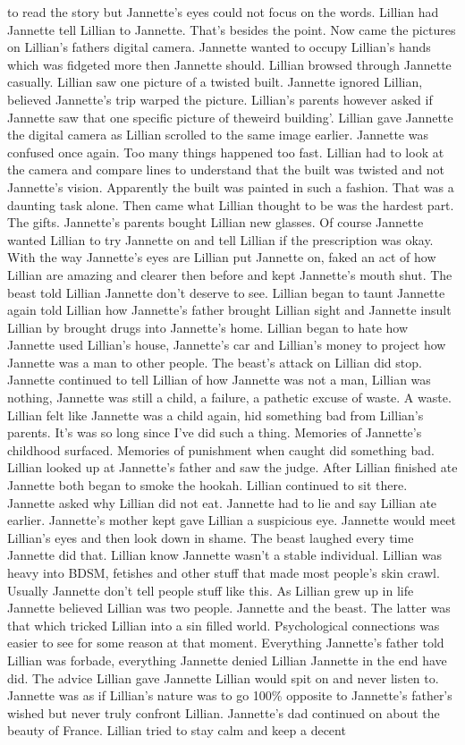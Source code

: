 \documentclass[12pt]{book}
\begin{document}
to read the story but Jannette's eyes could not focus on the words. Lillian had Jannette tell Lillian to Jannette. That's besides the point. Now came the pictures on Lillian's fathers digital camera. Jannette wanted to occupy Lillian's hands which was fidgeted more then Jannette should. Lillian browsed through Jannette casually. Lillian saw one picture of a twisted built. Jannette ignored Lillian, believed Jannette's trip warped the picture. Lillian's parents however asked if Jannette saw that one specific picture of theweird building'. Lillian gave Jannette the digital camera as Lillian scrolled to the same image earlier. Jannette was confused once again. Too many things happened too fast. Lillian had to look at the camera and compare lines to understand that the built was twisted and not Jannette's vision. Apparently the built was painted in such a fashion. That was a daunting task alone. Then came what Lillian thought to be was the hardest part. The gifts. Jannette's parents bought Lillian new glasses. Of course Jannette wanted Lillian to try Jannette on and tell Lillian if the prescription was okay. With the way Jannette's eyes are Lillian put Jannette on, faked an act of how Lillian are amazing and clearer then before and kept Jannette's mouth shut. The beast told Lillian Jannette don't deserve to see. Lillian began to taunt Jannette again told Lillian how Jannette's father brought Lillian sight and Jannette insult Lillian by brought drugs into Jannette's home. Lillian began to hate how Jannette used Lillian's house, Jannette's car and Lillian's money to project how Jannette was a man to other people. The beast's attack on Lillian did stop. Jannette continued to tell Lillian of how Jannette was not a man, Lillian was nothing, Jannette was still a child, a failure, a pathetic excuse of waste. A waste. Lillian felt like Jannette was a child again, hid something bad from Lillian's parents. It's was so long since I've did such a thing. Memories of Jannette's childhood surfaced. Memories of punishment when caught did something bad. Lillian looked up at Jannette's father and saw the judge. After Lillian finished ate Jannette both began to smoke the hookah. Lillian continued to sit there. Jannette asked why Lillian did not eat. Jannette had to lie and say Lillian ate earlier. Jannette's mother kept gave Lillian a suspicious eye. Jannette would meet Lillian's eyes and then look down in shame. The beast laughed every time Jannette did that. Lillian know Jannette wasn't a stable individual. Lillian was heavy into BDSM, fetishes and other stuff that made most people's skin crawl. Usually Jannette don't tell people stuff like this. As Lillian grew up in life Jannette believed Lillian was two people. Jannette and the beast. The latter was that which tricked Lillian into a sin filled world. Psychological connections was easier to see for some reason at that moment. Everything Jannette's father told Lillian was forbade, everything Jannette denied Lillian Jannette in the end have did. The advice Lillian gave Jannette Lillian would spit on and never listen to. Jannette was as if Lillian's nature was to go 100\% opposite to Jannette's father's wished but never truly confront Lillian. Jannette's dad continued on about the beauty of France. Lillian tried to stay calm and keep a decent 
\end{document}
